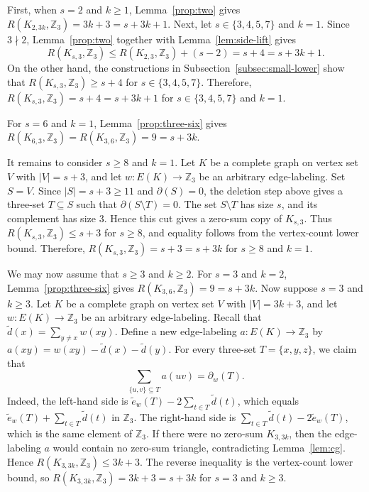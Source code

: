﻿\documentclass[11pt]{article}
\numberwithin{equation}{section}
\theoremstyle{remark}
\newcommand{\Z}{\mathbb Z}
\newcommand{\td}{\tilde{d}}
\newcommand{\te}{\tilde{e}}
\begin{document}
First, when $s=2$ and $k\ge1$, Lemma~\ref{prop:two} gives $R(K_{2,3k},\Z_3)=3k+3=s+3k+1$.
Next, let $s\in\{3,4,5,7\}$ and $k=1$. Since $3\nmid 2$, Lemma~\ref{prop:two} together with Lemma~\ref{lem:side-lift} gives
\[R(K_{s,3},\Z_3)\le R(K_{2,3},\Z_3)+(s-2)=s+4=s+3k+1.\]
On the other hand, the constructions in Subsection~\ref{subsec:small-lower} show that $R(K_{s,3},\Z_3)\ge s+4$ for $s\in\{3,4,5,7\}$.
Therefore, $R(K_{s,3},\Z_3)=s+4=s+3k+1$ for $s\in\{3,4,5,7\}$ and $k=1$.

For $s=6$ and $k=1$, Lemma~\ref{prop:three-six} gives $R(K_{6,3},\Z_3)=R(K_{3,6},\Z_3)=9=s+3k$.

It remains to consider $s\ge8$ and $k=1.$  Let $K$ be a complete graph on vertex set $V$ with $|V|=s+3$, and let $w\colon E(K)\to\Z_3$ be an arbitrary edge-labeling. Set $S=V$.  Since $|S|=s+3\ge11$ and $\partial(S)=0$, the deletion step above gives a three-set $T\subseteq S$ such that $\partial(S\setminus T)=0$.  The set $S\setminus T$ has size $s$, and its complement has size $3$. Hence this cut gives a zero-sum copy of $K_{s,3}$.  Thus $R(K_{s,3},\Z_3)\le s+3$ for $s\ge8$, and equality follows from the vertex-count lower bound. Therefore,  $R(K_{s,3},\Z_3)=s+3=s+3k$ for $s\ge8$ and $k=1.$

We may now assume that $s\ge 3$ and $k\ge 2.$
For $s=3$ and $k=2$, Lemma~\ref{prop:three-six} gives $R(K_{3,6},\Z_3)=9=s+3k$.
Now suppose $s=3$ and $k\ge3$. Let $K$ be a complete graph on vertex set $V$ with $|V|=3k+3$, and let
$w\colon E(K)\to\Z_3$ be an arbitrary edge-labeling. Recall that $\td(x)=\sum_{y\ne x}w(xy)$. Define a new edge-labeling $a\colon E(K)\to\Z_3$ by $a(xy)=w(xy)-\td(x)-\td(y)$.  For every three-set $T=\{x,y,z\}$, we claim that
\[
    \sum_{\{u,v\}\subseteq T}a(uv)=\partial_w(T).
\]
Indeed, the left-hand side is $\te_w(T)-2\sum_{t\in T}\td(t)$, which equals $\te_w(T)+\sum_{t\in T}\td(t)$ in $\Z_3$. The right-hand side is $\sum_{t\in T}\td(t)-2\te_w(T)$, which is the same element of $\Z_3$.  If there were no zero-sum $K_{3,3k}$, then the edge-labeling $a$ would contain no zero-sum triangle, contradicting Lemma~\ref{lem:cg}.  Hence $R(K_{3,3k},\Z_3)\le3k+3$. The reverse inequality is the vertex-count lower bound, so $R(K_{3,3k},\Z_3)=3k+3=s+3k$ for $s=3$ and $k\ge3$.
\end{document}
